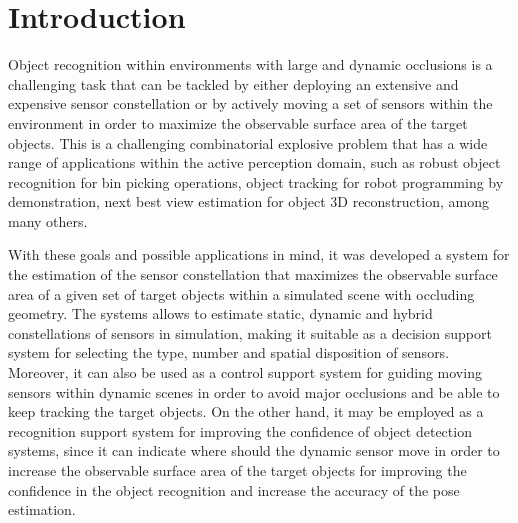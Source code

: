 \section{Introduction}\label{sec:introduction}


Object recognition within environments with large and dynamic occlusions is a challenging task that can be tackled by either deploying an extensive and expensive sensor constellation or by actively moving a set of sensors within the environment in order to maximize the observable surface area of the target objects. This is a challenging combinatorial explosive problem that has a wide range of applications within the active perception domain, such as robust object recognition for bin picking operations, object tracking for robot programming by demonstration, next best view estimation for object 3D reconstruction, among many others.

With these goals and possible applications in mind, it was developed a system for the estimation of the sensor constellation that maximizes the observable surface area of a given set of target objects within a simulated scene with occluding geometry. The systems allows to estimate static, dynamic and hybrid constellations of sensors in simulation, making it suitable as a decision support system for selecting the type, number and spatial disposition of sensors. Moreover, it can also be used as a control support system for guiding moving sensors within dynamic scenes in order to avoid major occlusions and be able to keep tracking the target objects. On the other hand, it may be employed as a recognition support system for improving the confidence of object detection systems, since it can indicate where should the dynamic sensor move in order to increase the observable surface area of the target objects for improving the confidence in the object recognition and increase the accuracy of the pose estimation.

